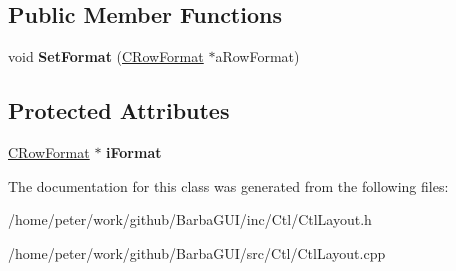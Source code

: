 \subsection*{Public Member Functions}
\begin{DoxyCompactItemize}
\item 
\mbox{\label{classCRowLayout_a535248e9b72de5c552c156e22e38cb1a}} 
void {\bfseries Set\+Format} (\hyperlink{classCRowFormat}{C\+Row\+Format} $\ast$a\+Row\+Format)
\end{DoxyCompactItemize}
\subsection*{Protected Attributes}
\begin{DoxyCompactItemize}
\item 
\mbox{\label{classCRowLayout_a85a0046e60788ca4cd978ca353afa41c}} 
\hyperlink{classCRowFormat}{C\+Row\+Format} $\ast$ {\bfseries i\+Format}
\end{DoxyCompactItemize}


The documentation for this class was generated from the following files\+:\begin{DoxyCompactItemize}
\item 
/home/peter/work/github/\+Barba\+G\+U\+I/inc/\+Ctl/Ctl\+Layout.\+h\item 
/home/peter/work/github/\+Barba\+G\+U\+I/src/\+Ctl/Ctl\+Layout.\+cpp\end{DoxyCompactItemize}
